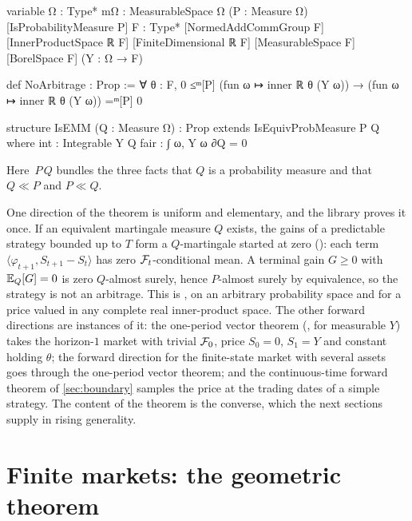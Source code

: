\documentclass[11pt]{article}
\begin{document}
\begin{leancode}[caption={No arbitrage and the equivalent martingale measure, $d$-asset one-period market (\texttt{Foundations/FTAPOnePeriodVector}).},label=lst:defs]
variable {Ω : Type*} {mΩ : MeasurableSpace Ω}
  (P : Measure Ω) [IsProbabilityMeasure P]
  {F : Type*} [NormedAddCommGroup F] [InnerProductSpace ℝ F]
  [FiniteDimensional ℝ F] [MeasurableSpace F] [BorelSpace F] (Y : Ω → F)

def NoArbitrage : Prop :=
  ∀ θ : F, 0 ≤ᵐ[P] (fun ω ↦ inner ℝ θ (Y ω)) →
    (fun ω ↦ inner ℝ θ (Y ω)) =ᵐ[P] 0

structure IsEMM (Q : Measure Ω) : Prop extends IsEquivProbMeasure P Q where
  int  : Integrable Y Q
  fair : ∫ ω, Y ω ∂Q = 0
\end{leancode}
Here \,$P\,Q$ bundles the three facts that $Q$ is a probability measure and that
$Q\ll P$ and $P\ll Q$.

One direction of the theorem is uniform and elementary, and the library proves it once. If an equivalent
martingale measure $Q$ exists, the gains of a predictable strategy bounded up to $T$ form a $Q$-martingale
started at zero (): each term
$\langle\varphi_{t+1},S_{t+1}-S_t\rangle$ has zero $\mathcal{F}_t$-conditional mean. A terminal gain $G\ge0$ with
$\mathbb{E}_Q[G]=0$ is zero $Q$-almost surely, hence $P$-almost surely by equivalence, so the strategy is not an
arbitrage. This is , on an arbitrary probability space and for a price valued in
any complete real inner-product space. The other forward directions are instances of it: the
one-period vector theorem (, for measurable $Y$) takes the
horizon-$1$ market with trivial $\mathcal{F}_0$, price $S_0=0$, $S_1=Y$ and constant holding $\theta$; the forward direction for the
finite-state market with several assets goes through the one-period vector theorem; and the continuous-time forward theorem of
\cref{sec:boundary} samples the price at the trading dates of a simple strategy. The content of the theorem is the converse,
which the next sections supply in rising generality.

\section{Finite markets: the geometric theorem}\label{sec:finite}
\end{document}
